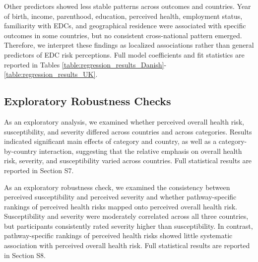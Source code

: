 Other predictors showed less stable patterns across outcomes and countries. Year of birth, income, parenthood, education, perceived health, employment status, familiarity with EDCs, and geographical residence were associated with specific outcomes in some countries, but no consistent cross-national pattern emerged. Therefore, we interpret these findings as localized associations rather than general predictors of EDC risk perceptions. Full model coefficients and fit statistics are reported in Tables \ref{table:regression_results_Danish}-\ref{table:regression_results_UK}.





\subsection{Exploratory Robustness Checks}
As an exploratory analysis, we examined whether perceived overall health risk, susceptibility, and severity differed across countries and across categories. Results indicated significant main effects of category and country, as well as a category-by-country interaction, suggesting that the relative emphasis on overall health risk, severity, and susceptibility varied across countries. Full statistical results are reported in Section S7.

As an exploratory robustness check, we examined the consistency between perceived susceptibility and perceived severity and whether pathway-specific rankings of perceived health risks mapped onto perceived overall health risk. Susceptibility and severity were moderately correlated across all three countries, but participants consistently rated severity higher than susceptibility. In contrast, pathway-specific rankings of perceived health risks showed little systematic association with perceived overall health risk. Full statistical results are reported in Section S8.